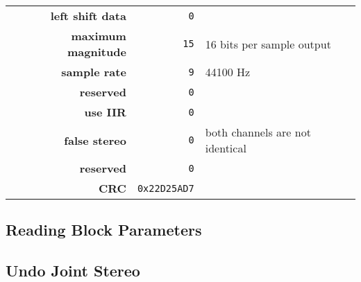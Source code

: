 {\begin{tabular}{rrl}
    \textbf{left shift data} & \texttt{0} \\
    \textbf{maximum magnitude} & \texttt{15} & 16 bits per sample output \\
    \textbf{sample rate} & \texttt{9} & 44100 Hz \\
    \textbf{reserved} & \texttt{0} \\
    \textbf{use IIR} & \texttt{0} \\
    \textbf{false stereo} & \texttt{0} & both channels are not identical \\
    \textbf{reserved} & \texttt{0} \\
    \textbf{CRC} & \texttt{0x22D25AD7} \\
  \end{tabular}
}

\clearpage

\subsection{Reading Block Parameters}
\label{wavpack:read_block_parameters}
{

}

\clearpage



\clearpage



\clearpage



\clearpage



\clearpage



\clearpage



\clearpage

\subsection{Undo Joint Stereo}
\label{wavpack:undo_joint_stereo}


